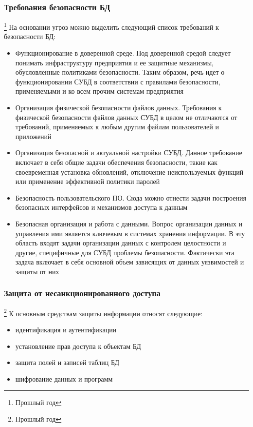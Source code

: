 \subsubsection{Требования безопасности БД}\footnote{Прошлый год}
На основании угроз можно выделить следующий список требований к безопасности БД:
\begin{itemize}
	\item Функционирование в доверенной среде. Под доверенной средой следует понимать инфраструктуру предприятия и ее защитные механизмы, обусловленные политиками безопасности. Таким образом, речь идет о функционировании СУБД в соответствии с правилами безопасности, применяемыми и ко всем прочим системам предприятия
	
	\item Организация физической безопасности файлов данных. Требования к физической безопасности файлов данных СУБД в целом не отличаются от требований, применяемых к любым другим файлам пользователей и приложений
	
	\item Организация безопасной и актуальной настройки СУБД. Данное требование включает в себя общие задачи обеспечения безопасности, такие как своевременная установка обновлений, отключение неиспользуемых функций или применение эффективной политики паролей
	
	\item Безопасность пользовательского ПО. Сюда можно отнести задачи построения безопасных интерфейсов и механизмов доступа к данным
	
	\item Безопасная организация и работа с данными. Вопрос организации данных и управления ими является ключевым в системах хранения информации. В эту область входят задачи организации данных с контролем целостности и другие, специфичные для СУБД проблемы безопасности. Фактически эта задача включает в себя основной объем зависящих от данных уязвимостей и защиты от них
\end{itemize}

\subsubsection{Защита от несанкционированного доступа}\footnote{Прошлый год}
К основным средствам защиты информации относят следующие:
\begin{itemize}
	\item идентификация и аутентификации
	\item установление прав доступа к объектам БД
	\item защита полей и записей таблиц БД
	\item шифрование данных и программ
\end{itemize}

